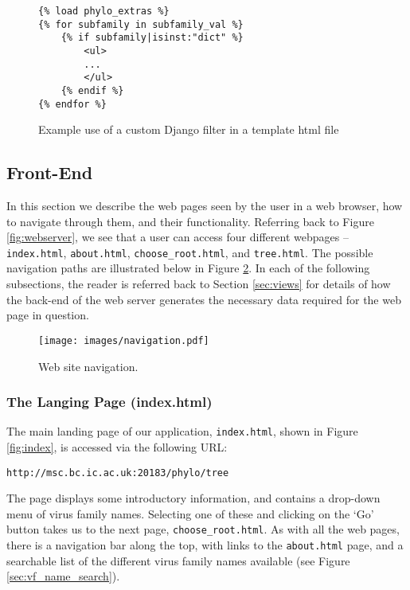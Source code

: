 \documentclass[12pt,a4paper]{article}
\begin{document}
\singlespace
\begin{figure}[H]
\begin{verbatim}
{% load phylo_extras %}
{% for subfamily in subfamily_val %}
    {% if subfamily|isinst:"dict" %}
        <ul>
        ...
        </ul>
    {% endif %}
{% endfor %}
\end{verbatim}
\caption{Example use of a custom Django filter in a template html file}
\label{fig:custom_filter_code}
\end{figure}
\doublespace


\subsection{Front-End}
\label{sec:front_end}
In this section we describe the web pages seen by the user in a web browser, how to navigate through them, and their functionality. Referring back to Figure \ref{fig:webserver}, we see that a user can access four different webpages -- \texttt{index.html}, \texttt{about.html}, \texttt{choose\_root.html}, and \texttt{tree.html}. The possible navigation paths are illustrated below in Figure \ref{fig:navigation}. In each of the following subsections, the reader is referred back to Section \ref{sec:views} for details of how the back-end of the web server generates the necessary data required for the web page in question.

\begin{figure}[h]
\centering
\texttt{[image: images/navigation.pdf]}
\caption{Web site navigation.}
\label{fig:navigation}
\end{figure}

\subsubsection{The Langing Page (index.html)}
The main landing page of our application, \texttt{index.html}, shown in Figure \ref{fig:index}, is accessed via the following URL:

\begin{verbatim}
http://msc.bc.ic.ac.uk:20183/phylo/tree
\end{verbatim}

The page displays some introductory information, and contains a drop-down menu of virus family names. Selecting one of these and clicking on the `Go' button takes us to the next page, \texttt{choose\_root.html}. As with all the web pages, there is a navigation bar along the top, with links to the \texttt{about.html} page, and a searchable list of the different virus family names available (see Figure \ref{sec:vf_name_search}).
\end{document}
